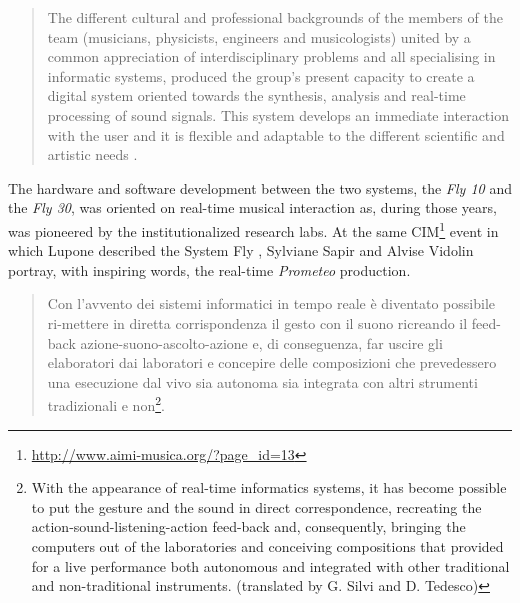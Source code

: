 \documentclass[twoside,a4paper]{article}
\begin{document}

\begin{quote}
The different cultural and professional backgrounds of the members of the team
(musicians, physicists, engineers and musicologists) united by a common
appreciation of interdisciplinary problems and all specialising in informatic
systems, produced the group's present capacity to create a digital system
oriented towards the synthesis, analysis and real-time processing of sound
signals. This system develops an immediate interaction with the user and it is
flexible and adaptable to the different scientific and artistic needs \cite{ml91}.
\end{quote}

The hardware and software development between the two systems, the \emph{Fly 10}
and the \emph{Fly 30}, was oriented on real-time musical interaction as, during
those years, was pioneered by the institutionalized research labs. At the same
CIM\footnote{\url{http://www.aimi-musica.org/?page_id=13}} event in which Lupone
described the System Fly \cite{ml85}, Sylviane Sapir and Alvise Vidolin
\cite{savi85} portray, with inspiring words, the real-time \emph{Prometeo}
production.

\begin{quote}
Con l'avvento dei sistemi informatici in tempo reale è diventato possibile
ri-mettere in diretta corrispondenza il gesto con il suono ricreando il feed-back
azione-suono-ascolto-azione e, di conseguenza, far uscire gli elaboratori dai
laboratori e concepire delle composizioni che prevedessero una esecuzione dal
vivo sia autonoma sia integrata con altri strumenti tradizionali e
non\footnote{With the appearance of real-time informatics systems, it has become
possible to put the gesture and the sound in direct correspondence, recreating
the action-sound-listening-action feed-back and, consequently, bringing the
computers out of the laboratories and conceiving compositions that provided for a
live performance both autonomous and integrated with other traditional and
non-traditional instruments. (translated by G. Silvi and D. Tedesco)}.
\end{quote}
\end{document}
